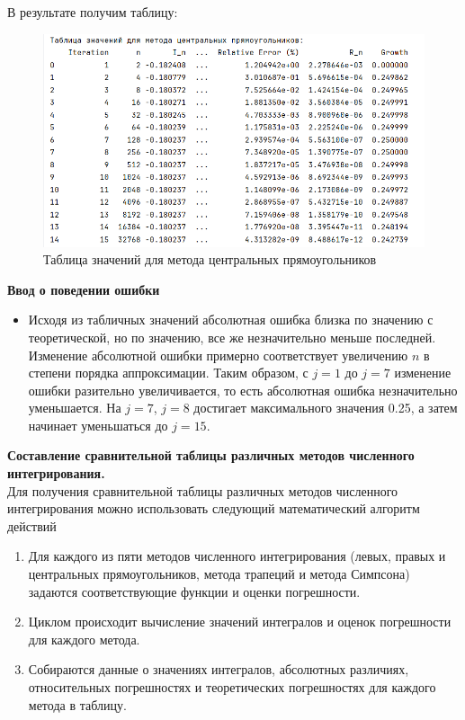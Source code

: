 \documentclass{article}
\begin{document}
В результате получим таблицу:
\begin{figure}[h]
    \centering
    \includegraphics[width=1\textwidth]{lab_4_1.png}
    \caption{ Таблица значений для метода центральных прямоугольников}
    \label{fig:my_label}
\end{figure}


\textbf{\large{Ввод о поведении ошибки}} \\

\begin{itemize}
    \item Исходя из табличных значений абсолютная ошибка близка по значению с теоретической, но по значению, все же незначительно меньше последней. Изменение абсолютной ошибки примерно соответствует увеличению $n$ в степени порядка аппроксимации. Таким образом, с $j=1$ до $j=7$ изменение ошибки разительно увеличивается, то есть абсолютная ошибка незначительно уменьшается. На $j=7$, $j=8$ достигает максимального значения 0.25, а затем начинает уменьшаться до $j=15$.
\end{itemize}

\textbf{\large{Составление сравнительной таблицы различных методов численного интегрирования.}} \\

Для получения сравнительной таблицы различных методов численного интегрирования можно использовать следующий математический алгоритм действий

\begin{enumerate}
\item Для каждого из пяти методов численного интегрирования (левых, правых и центральных прямоугольников, метода трапеций и метода Симпсона) задаются соответствующие функции и оценки погрешности.
\item Циклом происходит вычисление значений интегралов и оценок погрешности для каждого метода.
\item Собираются данные о значениях интегралов, абсолютных различиях, относительных погрешностях и теоретических погрешностях для каждого метода в таблицу.

\end{enumerate}
\end{document}
